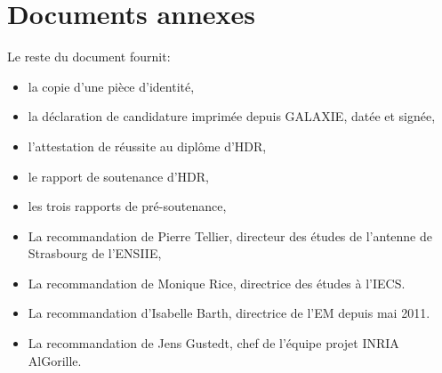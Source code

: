 \documentclass[11pt]{article}
\begin{document}
%



\newpage
\section{Documents annexes}

Le reste du document fournit:\\
\begin{itemize}
\item la copie d'une pièce d'identité,
\item la déclaration de candidature imprimée depuis GALAXIE, datée et signée,
\item l'attestation de réussite au diplôme d'HDR,
\item le rapport de soutenance d'HDR,
\item les trois rapports de pré-soutenance,
\item La recommandation de Pierre Tellier, directeur des études de l'antenne de Strasbourg de l'ENSIIE,
\item La recommandation de Monique Rice, directrice des études à l'IECS.
\item La recommandation d'Isabelle Barth, directrice de l'EM depuis mai 2011.
\item La recommandation de Jens Gustedt, chef de l'équipe projet INRIA AlGorille. 
\end{itemize}
\end{document}
